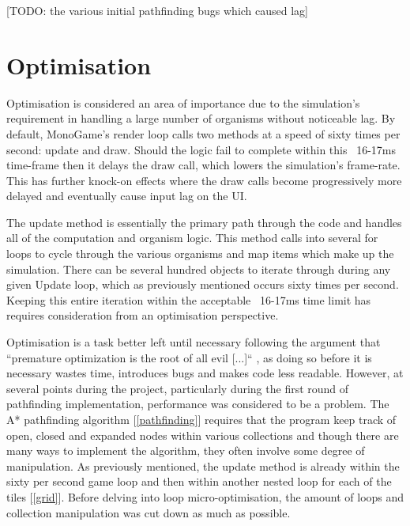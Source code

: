\documentclass[a4paper, oneside, 11pt]{report}
\begin{document}
[TODO: the various initial pathfinding bugs which caused lag]

\section{Optimisation}\label{optim}
Optimisation is considered an area of importance due to the simulation's requirement in handling a large number of organisms without noticeable lag. By default, MonoGame's render loop calls two methods at a speed of sixty times per second: update and draw. Should the logic fail to complete within this ~16-17ms time-frame then it delays the draw call, which lowers the simulation's frame-rate. This has further knock-on effects where the draw calls become progressively more delayed and eventually cause input lag on the UI.

The update method is essentially the primary path through the code and handles all of the computation and organism logic. This method calls into several for loops to cycle through the various organisms and map items which make up the simulation. There can be several hundred objects to iterate through during any given Update loop, which as previously mentioned occurs sixty times per second. Keeping this entire iteration within the acceptable ~16-17ms time limit has requires consideration from an optimisation perspective.

Optimisation is a task better left until necessary following the argument that ``premature optimization is the root of all evil [...]`` \cite{knuth}, as doing so before it is necessary wastes time, introduces bugs and makes code less readable. However, at several points during the project, particularly during the first round of pathfinding implementation, performance was considered to be a problem. The A* pathfinding algorithm [\ref{pathfinding}] requires that the program keep track of open, closed and expanded nodes within various collections and though there are many ways to implement the algorithm, they often involve some degree of manipulation. As previously mentioned, the update method is already within the sixty per second game loop and then within another nested loop for each of the tiles [\ref{grid}]. Before delving into loop micro-optimisation, the amount of loops and collection manipulation was cut down as much as possible.
\end{document}
